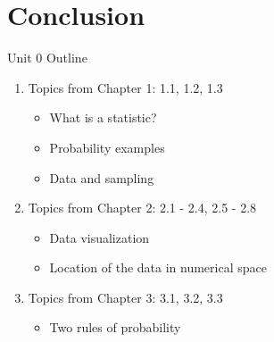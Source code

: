 \documentclass{beamer}
\begin{document}
\section{Conclusion}

\begin{frame}{Unit 0 Outline}
\begin{enumerate}
\item Topics from Chapter 1: 1.1, 1.2, 1.3
\begin{itemize}
\item What is a statistic?
\item Probability examples
\item Data and sampling
\end{itemize}
\item Topics from Chapter 2: 2.1 - 2.4, 2.5 - 2.8
\begin{itemize}
\item Data visualization
\item Location of the data in numerical space
\end{itemize}
\item Topics from Chapter 3: 3.1, 3.2, 3.3
\begin{itemize}
\item Two rules of probability
\end{itemize}
\end{enumerate}
\end{frame}
\end{document}
